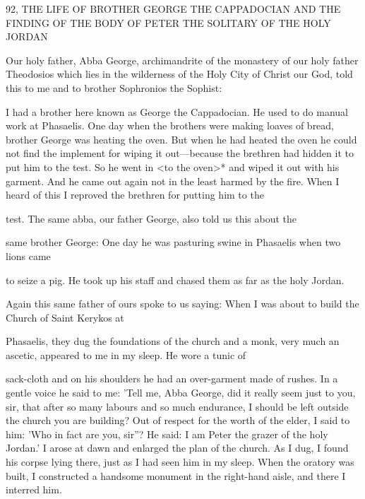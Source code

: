 92, THE LIFE OF BROTHER GEORGE
THE CAPPADOCIAN AND THE FINDING OF THE BODY
OF PETER THE SOLITARY OF THE HOLY JORDAN

Our holy father, Abba George, archimandrite of the monastery of
our holy father Theodosios which lies in the wilderness of the Holy
City of Christ our God, told this to me and to brother Sophronios
the Sophist:

I had a brother here known as George the Cappadocian. He used
to do manual work at Phasaelis. One day when the brothers were
making loaves of bread, brother George was heating the oven. But
when he had heated the oven he could not find the implement for
wiping it out—because the brethren had hidden it to put him to the
test. So he went in <to the oven>* and wiped it out with his
garment. And he came out again not in the least harmed by the fire.
When I heard of this I reproved the brethren for putting him to the

test.
The same abba, our father George, also told us this about the

same brother George:
One day he was pasturing swine in Phasaelis when two lions came

to seize a pig. He took up his staff and chased them as far as the
holy Jordan.

Again this same father of ours spoke to us saying:
When I was about to build the Church of Saint Kerykos at

Phasaelis, they dug the foundations of the church and a monk, very
much an ascetic, appeared to me in my sleep. He wore a tunic of

sack-cloth and on his shoulders he had an over-garment made of
rushes. In a gentle voice he said to me: 'Tell me, Abba George, did
it really seem just to you, sir, that after so many labours and so
much endurance, I should be left outside the church you are
building? Out of respect for the worth of the elder, I said to him:
'Who in fact are you, sir”? He said: \textquotesingle I am Peter the grazer of the
holy Jordan.' I arose at dawn and enlarged the plan of the church.
As I dug, I found his corpse lying there, just as I had seen him in
my sleep. When the oratory was built, I constructed a handsome
monument in the right-hand aisle, and there I interred him.


